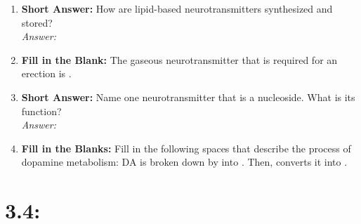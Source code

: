 \begin{enumerate}[label=\textbf{Q3.3.\arabic*}]
    \item \textbf{Short Answer:} How are lipid-based neurotransmitters synthesized and stored? \\
        \textit{Answer:} %

    \item \textbf{Fill in the Blank:} The gaseous neurotransmitter that is required for an erection is \underline{\hspace{3cm}}.

    \item \textbf{Short Answer:} Name one neurotransmitter that is a nucleoside. What is its function? \\
        \textit{Answer:} %

    \item \textbf{Fill in the Blanks:} Fill in the following spaces that describe the process of dopamine metabolism:
    DA is broken down by \underline{\hspace{3cm}} into \underline{\hspace{3cm}}. Then, \underline{\hspace{3cm}} converts it into \underline{\hspace{3cm}}. \\
\end{enumerate}

\squigglyline
\section*{3.4: %
}

